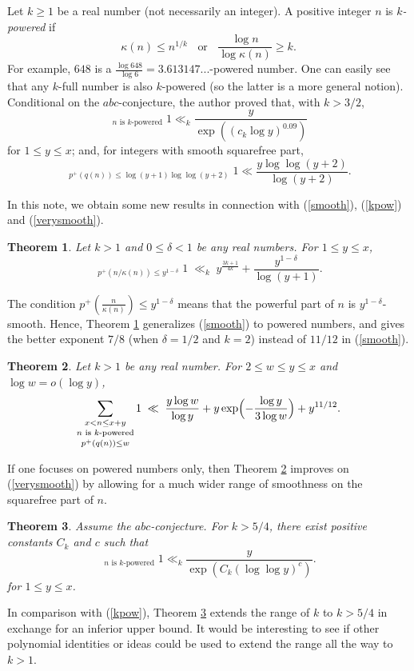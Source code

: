 \documentclass[12pt]{article}
\newtheorem{theorem}{Theorem}
\begin{document}
Let $k \ge 1$ be a real number (not necessarily an integer). A positive integer $n$ is {\it $k$-powered} if
\[
\kappa(n) \le n^{1/k} \; \; \text{ or } \; \; \frac{\log n}{\log \kappa(n)} \ge k.
\]
For example, $648$ is a $\frac{\log 648}{\log 6} = 3.613147...$-powered number. One can easily see that any $k$-full number is also $k$-powered (so the latter is a more general notion). Conditional on the $abc$-conjecture, the author \cite{C:2024} proved that, with $k > 3/2$,
\begin{equation} \label{kpow}
\mathop{\sum_{x < n \le x + y}}_{n \text{ is $k$-powered}} 1 \ll_k \frac{y}{\exp( (c_k \log y)^{0.09})}
\end{equation}
for $1 \le y \le x$; and, for integers with smooth squarefree part,
\begin{equation} \label{verysmooth}
\mathop{\sum_{x < n \le x + y}}_{p^+(q(n)) \le \log (y + 1) \log \log (y + 2)} 1 \ll \frac{y \log \log (y +2)}{\log (y + 2)}.
\end{equation}

In this note, we obtain some new results in connection with (\ref{smooth}), (\ref{kpow}) and (\ref{verysmooth}).
\begin{theorem} \label{thm1}
Let $k > 1$ and $0 \le \delta < 1$ be any real numbers. For $1 \le y \le x$,
\[
\mathop{\mathop{\sum_{x < n \le x + y}}_{n \text{ is $k$-powered}}}_{p^{+}(n / \kappa(n)) \le y^{1 - \delta}} 1 \; \ll_k \; y^{\frac{3k + 1}{4k}} + \frac{y^{1 - \delta}}{\log (y + 1)}.
\]
\end{theorem}
The condition $p^{+}(\frac{n}{\kappa(n)}) \le y^{1 - \delta}$ means that the powerful part of $n$ is $y^{1 - \delta}$-smooth. Hence, Theorem \ref{thm1} generalizes (\ref{smooth}) to powered numbers, and gives the better exponent $7/8$ (when $\delta = 1/2$ and $k = 2$) instead of $11/12$ in (\ref{smooth}).

\begin{theorem} \label{thm2}
Let $k > 1$ be any real number. For $2 \le w \le y \le x$ and $\log w = o(\log y)$,
\[
\mathop{\mathop{\sum_{x < n \le x + y}}_{n \text{ is $k$-powered}}}_{p^+(q(n)) \le w} 1 \; \ll \; \frac{y \log w}{\log y} + y \exp \Bigl(- \frac{\log y}{3 \log w} \Bigr) + y^{11/12}.
\]
\end{theorem}
If one focuses on powered numbers only, then Theorem \ref{thm2} improves on (\ref{verysmooth}) by allowing for a much wider range of smoothness on the squarefree part of $n$.

\begin{theorem} \label{thm3}
Assume the $abc$-conjecture. For $k > 5/4$, there exist positive constants $C_k$ and  $c$ such that
\[
\mathop{\sum_{x < n \le x + y}}_{n \text{ is $k$-powered}} 1 \ll_k \frac{y}{\exp( C_k (\log \log y)^{c})}.
\]
for $1 \le y \le x$.
\end{theorem}
In comparison with (\ref{kpow}), Theorem \ref{thm3} extends the range of $k$ to $k > 5/4$ in exchange for an inferior upper bound. It would be interesting to see if other polynomial identities or ideas could be used to extend the range all the way to $k > 1$.
\end{document}

